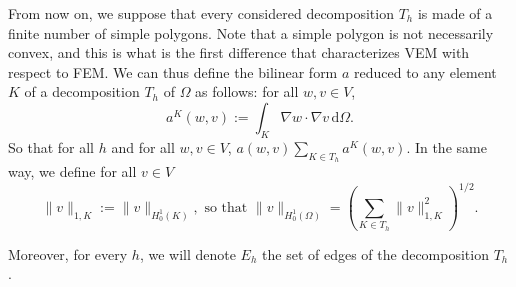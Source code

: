 \noindent From now on, we suppose that every considered decomposition $T_h$ is made of a finite number of simple polygons. Note that a simple polygon is not necessarily convex, and this is what is the first difference that characterizes VEM with respect to FEM. 
We can thus define the bilinear form $a$ reduced to any element $K$ of a decomposition $T_h$ of $\Omega$ as follows: for all $w,v\in V$,
$$ a^K(w,v) := \int_K \nabla w \cdot \nabla v \, \mathrm{d}\Omega. $$
So that for all $h$ and for all $w,v\in V$, $a(w,v) \sum_{K\in T_h} a^K(w,v)$. In the same way, we define for all $v\in V$
$$ \|v\|_{1, K} := \|v\|_{H_0^1(K)}, \text{ so that } \|v\|_{H_0^1(\Omega)} = \left(\sum_{K\in T_h} \|v\|_{1,K}^2\right)^{1/2}.$$

\noindent Moreover, for every $h$, we will denote $E_h$ the set of edges of the decomposition $T_h$. 

